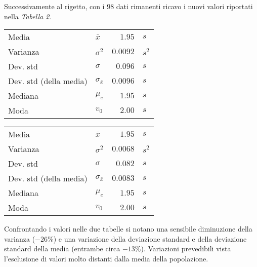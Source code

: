 \documentclass{article}
\begin{document}
	Successivamente al rigetto, con i $98$ dati rimanenti ricavo i nuovi valori riportati nella \textit{Tabella 2}.
	
	\vspace{0.8cm}
	\begin{minipage}[c]{0.45\textwidth}
		\centering
		\begin{tabular}{llrl}
			Media                       & $\bar{x}$             & $1.95$        & $s$       \\
			Varianza                    & $\sigma ^ 2$          & $0.0092$     & $s^2$  \\
			Dev. std                    & $\sigma$              & $0.096$      & $s$   \\
			Dev. std (della media)      & $\sigma_{\bar{x}}$    & $0.0096$     & $s$    \\
			Mediana                     & $\mu_e$               & $1.95$        &  $s$      \\
			Moda                        & $v_0$                 & $2.00$        & $s$
		\end{tabular}
	\end{minipage}
	\begin{minipage}[c]{0.5\textwidth}
		\centering
		\begin{tabular}{llrl}
			Media                       & $\bar{x}$             & $1.95$        & $s$       \\
			Varianza                    & $\sigma ^ 2$          & $0.0068$     & $s^2$  \\
			Dev. std                    & $\sigma$              & $0.082$      & $s$   \\
			Dev. std (della media)      & $\sigma_{\bar{x}}$    & $0.0083$     & $s$    \\
			Mediana                     & $\mu_e$               & $1.95$        &  $s$      \\
			Moda                        & $v_0$                 & $2.00$        & $s$
		\end{tabular}
	\end{minipage}
	\vspace{0.8cm}
	
	\noindent
	Confrontando i valori nelle due tabelle si notano una sensibile diminuzione della varianza ($-26 \%$) e una variazione della deviazione standard e della deviazione standard della media (entrambe circa $-13 \%$). Variazioni prevedibili vista l'esclusione di valori molto distanti dalla media della popolazione. \\
	
\end{document}
